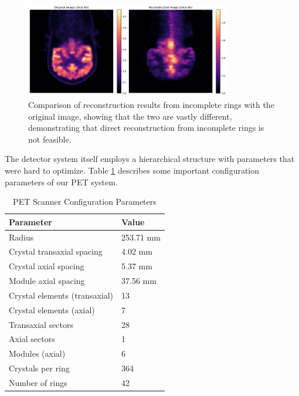 \documentclass[12pt]{iopart}
\begin{document}
\begin{figure}[htbp]
    \centering
    \vspace{-0.2cm}
    \includegraphics[width=0.8\textwidth]{Images/output2}
    \vspace{-0.2cm}
    \caption{Comparison of reconstruction results from incomplete rings with the original image, showing that the two are vastly different, demonstrating that direct reconstruction from incomplete rings is not feasible.}
    \vspace{-0.2cm}
    \label{fig:pet_incomplete_reconstruction}
\end{figure}

The detector system itself employs a hierarchical structure with parameters that were hard to optimize. Table \ref{tab:detector_params} describes some important configuration parameters of our PET system.

\begin{table}[htbp]
    \centering
    \caption{PET Scanner Configuration Parameters}
    \label{tab:detector_params}
    \begin{tabular}{l l}
    \toprule
    \textbf{Parameter} & \textbf{Value} \\
    \midrule
    Radius & 253.71 mm \\
    Crystal transaxial spacing & 4.02 mm \\
    Crystal axial spacing & 5.37 mm \\
    Module axial spacing & 37.56 mm \\
    Crystal elements (transaxial) & 13 \\
    Crystal elements (axial) & 7 \\
    Transaxial sectors & 28 \\
    Axial sectors & 1 \\
    Modules (axial) & 6 \\
    Crystals per ring & 364 \\
    Number of rings & 42 \\
    \bottomrule
    \end{tabular}
\end{table}
\end{document}
